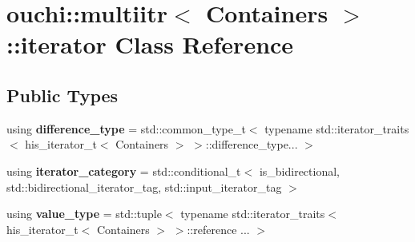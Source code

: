 \hypertarget{classouchi_1_1multiitr_1_1iterator}{}\section{ouchi\+::multiitr$<$ Containers $>$\+::iterator Class Reference}
\label{classouchi_1_1multiitr_1_1iterator}
\subsection*{Public Types}
\begin{DoxyCompactItemize}
\item 
\mbox{\label{classouchi_1_1multiitr_1_1iterator_a07ffc53180065a917e8199e6067e0db4}} 
using {\bfseries difference\+\_\+type} = std\+::common\+\_\+type\+\_\+t$<$ typename std\+::iterator\+\_\+traits$<$ his\+\_\+iterator\+\_\+t$<$ Containers $>$ $>$\+::difference\+\_\+type... $>$
\item 
\mbox{\label{classouchi_1_1multiitr_1_1iterator_a5898942be0c37238a581365ddd5b5be4}} 
using {\bfseries iterator\+\_\+category} = std\+::conditional\+\_\+t$<$ is\+\_\+bidirectional, std\+::bidirectional\+\_\+iterator\+\_\+tag, std\+::input\+\_\+iterator\+\_\+tag $>$
\item 
\mbox{\label{classouchi_1_1multiitr_1_1iterator_adb194b15035ffcaac077865606f8742c}} 
using {\bfseries value\+\_\+type} = std\+::tuple$<$ typename std\+::iterator\+\_\+traits$<$ his\+\_\+iterator\+\_\+t$<$ Containers $>$ $>$\+::reference ... $>$
\end{DoxyCompactItemize}
